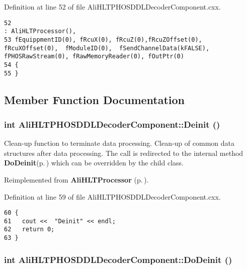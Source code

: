 Definition at line 52 of file Ali\-HLTPHOSDDLDecoder\-Component.cxx.

\footnotesize\begin{verbatim}52                                                                                                    : AliHLTProcessor(), 
53 fEquippmentID(0), fRcuX(0), fRcuZ(0),fRcuZOffset(0), fRcuXOffset(0),  fModuleID(0),  fSendChannelData(kFALSE), fPHOSRawStream(0), fRawMemoryReader(0), fOutPtr(0)
54 {
55 }
\end{verbatim}\normalsize 




\subsection{Member Function Documentation}
\subsubsection{\setlength{\rightskip}{0pt plus 5cm}int Ali\-HLTPHOSDDLDecoder\-Component::Deinit ()\hspace{0.3cm}{\tt  [virtual]}}\label{classAliHLTPHOSDDLDecoderComponent_a5}


Clean-up function to terminate data processing. Clean-up of common data structures after data processing. The call is redirected to the internal method {\bf Do\-Deinit}{\rm (p.\,\pageref{classAliHLTPHOSDDLDecoderComponent_a6})} which can be overridden by the child class. 

Reimplemented from {\bf Ali\-HLTProcessor} {\rm (p.\,\pageref{classAliHLTProcessor_a3})}.

Definition at line 59 of file Ali\-HLTPHOSDDLDecoder\-Component.cxx.

\footnotesize\begin{verbatim}60 {
61   cout <<  "Deinit" << endl;
62   return 0;
63 }
\end{verbatim}\normalsize 


\subsubsection{\setlength{\rightskip}{0pt plus 5cm}int Ali\-HLTPHOSDDLDecoder\-Component::Do\-Deinit ()\hspace{0.3cm}{\tt  [virtual]}}\label{classAliHLTPHOSDDLDecoderComponent_a6}


